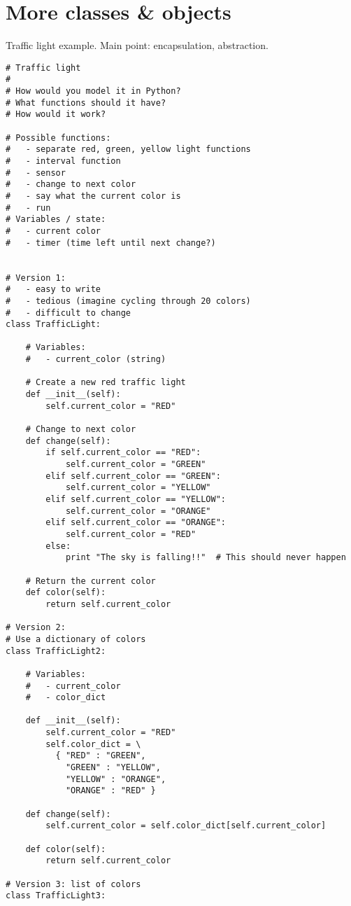 \documentclass{article}
\begin{document}
\newpage
\section{More classes \& objects}

Traffic light example.  Main point: encapsulation, abstraction.

\begin{verbatim}
# Traffic light
#
# How would you model it in Python?
# What functions should it have?
# How would it work?

# Possible functions:
#   - separate red, green, yellow light functions
#   - interval function
#   - sensor
#   - change to next color
#   - say what the current color is
#   - run
# Variables / state:
#   - current color
#   - timer (time left until next change?)


# Version 1:
#   - easy to write
#   - tedious (imagine cycling through 20 colors)
#   - difficult to change
class TrafficLight:

    # Variables:
    #   - current_color (string)

    # Create a new red traffic light
    def __init__(self):
        self.current_color = "RED"

    # Change to next color
    def change(self):
        if self.current_color == "RED":
            self.current_color = "GREEN"
        elif self.current_color == "GREEN":
            self.current_color = "YELLOW"
        elif self.current_color == "YELLOW":
            self.current_color = "ORANGE"
        elif self.current_color == "ORANGE":
            self.current_color = "RED"
        else:
            print "The sky is falling!!"  # This should never happen

    # Return the current color
    def color(self):
        return self.current_color

# Version 2:
# Use a dictionary of colors
class TrafficLight2:

    # Variables:
    #   - current_color
    #   - color_dict

    def __init__(self):
        self.current_color = "RED"
        self.color_dict = \
          { "RED" : "GREEN",
            "GREEN" : "YELLOW",
            "YELLOW" : "ORANGE",
            "ORANGE" : "RED" }

    def change(self):
        self.current_color = self.color_dict[self.current_color]

    def color(self):
        return self.current_color

# Version 3: list of colors
class TrafficLight3:


\end{verbatim}
\end{document}
